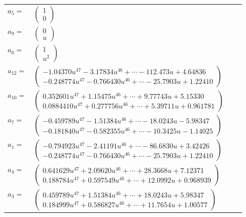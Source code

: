 \documentclass[1p]{elsarticle_modified}
\theoremstyle{definition}
\begin{document}
\begin{tabular}{m{7pt} m{180pt} m{7pt} m{180pt} }
\flushright $a_{5}=$&$\begin{pmatrix}1\\0\end{pmatrix}$ \\
\flushright $a_{9}=$&$\begin{pmatrix}0\\u\end{pmatrix}$ \\
\flushright $a_{6}=$&$\begin{pmatrix}1\\u^2\end{pmatrix}$ \\
\flushright $a_{12}=$&$\begin{pmatrix}-1.04370 u^{47}-3.17834 u^{46}+\cdots-112.473 u+4.64836\\-0.248774 u^{47}-0.766430 u^{46}+\cdots-25.7903 u+1.22410\end{pmatrix}$ \\
\flushright $a_{10}=$&$\begin{pmatrix}0.352601 u^{47}+1.15475 u^{46}+\cdots+9.77743 u+5.15330\\0.0884410 u^{47}+0.277756 u^{46}+\cdots+5.39711 u+0.961781\end{pmatrix}$ \\
\flushright $a_{7}=$&$\begin{pmatrix}-0.459789 u^{47}-1.51384 u^{46}+\cdots-18.0243 u-5.98347\\-0.181840 u^{47}-0.582355 u^{46}+\cdots-10.3425 u-1.14025\end{pmatrix}$ \\
\flushright $a_{1}=$&$\begin{pmatrix}-0.794923 u^{47}-2.41191 u^{46}+\cdots-86.6830 u+3.42426\\-0.248774 u^{47}-0.766430 u^{46}+\cdots-25.7903 u+1.22410\end{pmatrix}$ \\
\flushright $a_{4}=$&$\begin{pmatrix}0.641629 u^{47}+2.09620 u^{46}+\cdots+28.3668 u+7.12371\\0.188784 u^{47}+0.597549 u^{46}+\cdots+12.0992 u+0.968939\end{pmatrix}$ \\
\flushright $a_{3}=$&$\begin{pmatrix}0.459789 u^{47}+1.51384 u^{46}+\cdots+18.0243 u+5.98347\\0.184999 u^{47}+0.586827 u^{46}+\cdots+11.7654 u+1.00577\end{pmatrix}$ \\

\end{tabular}
\end{document}
